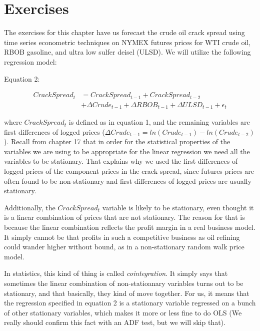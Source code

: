 \documentclass[
]{book}
\begin{document}
\hypertarget{exercises-10}{%
\section{Exercises}\label{exercises-10}}

The exercises for this chapter have us forecast the crude oil crack spread using time series econometric techniques on NYMEX futures prices for WTI crude oil, RBOB gasoline, and ultra low sulfer deisel (ULSD). We will utilize the following regression model:

Equation 2:

\begin{align}
Crack Spread_t &= Crack Spread_{t-1} + Crack Spread_{t-2}    \\
                  & + \Delta Crude_{t-1} + \Delta RBOB_{t-1} + \Delta ULSD_{t-1} + \epsilon_t
\end{align}

where \(Crack Spread_t\) is defined as in equation 1, and the remaining variables are first differences of logged prices (\(\Delta Crude_{t-1} = ln(Crude_{t-1}) - ln(Crude_{t-2})\)). Recall from chapter 17 that in order for the statistical properties of the variables we are using to be appropriate for the linear regression we need all the variables to be stationary. That explains why we used the first differences of logged prices of the component prices in the crack spread, since futures prices are often found to be non-stationary and first differences of logged prices are usually stationary.

Additionally, the \(Crack Spread_t\) variable is likely to be stationary, even thought it is a linear combination of prices that are not stationary. The reason for that is because the linear combination reflects the profit margin in a real business model. It simply cannot be that profits in such a competitive business as oil refining could wander higher without bound, as in a non-stationary random walk price model.

In statistics, this kind of thing is called \emph{cointegration}. It simply says that sometimes the linear combination of non-statioanary variables turns out to be stationary, and that basically, they kind of move together. For us, it means that the regression specified in equation 2 is a stationary variable regressed on a bunch of other stationary variables, which makes it more or less fine to do OLS (We really should confirm this fact with an ADF test, but we will skip that).
\end{document}
